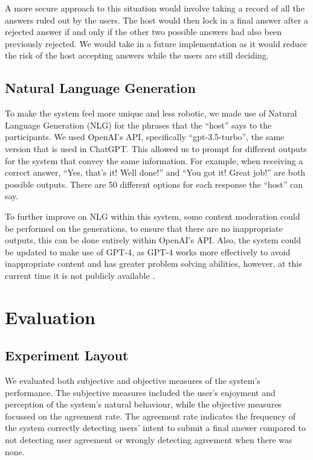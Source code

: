 \documentclass[hidelinks, 11pt]{article}
\begin{document}
A more secure approach to this situation would involve taking a record of all the answers ruled out by the users. The host would then lock in a final answer after a rejected answer if and only if the other two possible answers had also been previously rejected. We would take in a future implementation as it would reduce the risk of the host accepting answers while the users are still deciding.

\subsection{Natural Language Generation}
\label{subsec:nlg}

To make the system feel more unique and less robotic, we made use of Natural Language Generation (NLG) for the phrases that the “host” says to the participants. We used OpenAI's API, specifically “gpt-3.5-turbo”, the same version that is used in ChatGPT. This allowed us to prompt for different outputs for the system that convey the same information. For example, when receiving a correct answer, “Yes, that's it! Well done!” and “You got it! Great job!” are both possible outputs. There are 50 different options for each response the “host” can say.

To further improve on NLG within this system, some content moderation could be performed on the generations, to ensure that there are no inappropriate outputs, this can be done entirely within OpenAI's API.  Also, the system could be updated to make use of GPT-4, as GPT-4 works more effectively to avoid inappropriate content and has greater problem solving abilities, however, at this current time it is not publicly available \cite{GPT_4_2023,OpenAI_2023}.


\section{Evaluation}
\label{sec:evaluation}

\subsection{Experiment Layout}
\label{subsec:experiment_layout}
We evaluated both subjective and objective measures of the system's performance. The subjective measures included the user's enjoyment and perception of the system's natural behaviour, while the objective measures focussed on the agreement rate. The agreement rate indicates the frequency of the system correctly detecting users' intent to submit a final answer compared to not detecting user agreement or wrongly detecting agreement when there was none.
\end{document}
